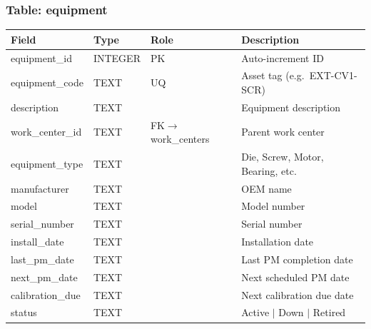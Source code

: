 \documentclass[11pt]{article}
\begin{document}
\subsubsection*{Table: equipment}
\begin{table}[H]\centering\small
\begin{tabular}{@{} l l l L{4.5cm} @{}}
\toprule
\textbf{Field} & \textbf{Type} & \textbf{Role} & \textbf{Description} \\
\midrule
equipment\_id    & INTEGER & PK  & Auto-increment ID \\
equipment\_code  & TEXT    & UQ  & Asset tag (e.g.\ EXT-CV1-SCR) \\
description      & TEXT    &     & Equipment description \\
work\_center\_id & TEXT    & FK$\to$work\_centers & Parent work center \\
equipment\_type  & TEXT    &     & Die, Screw, Motor, Bearing, etc. \\
manufacturer     & TEXT    &     & OEM name \\
model            & TEXT    &     & Model number \\
serial\_number   & TEXT    &     & Serial number \\
install\_date    & TEXT    &     & Installation date \\
last\_pm\_date   & TEXT    &     & Last PM completion date \\
next\_pm\_date   & TEXT    &     & Next scheduled PM date \\
calibration\_due & TEXT    &     & Next calibration due date \\
status           & TEXT    &     & Active $\mid$ Down $\mid$ Retired \\
\bottomrule
\end{tabular}
\end{table}
\end{document}
